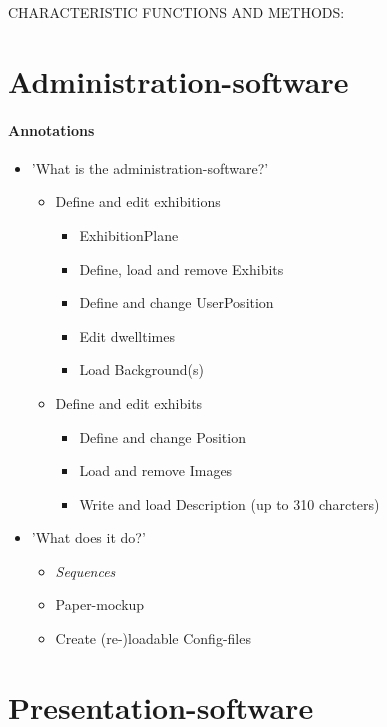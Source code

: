 CHARACTERISTIC FUNCTIONS AND METHODS: 


\section{Administration-software}
\label{implementation_administration}

\paragraph{Annotations}

\begin{itemize}
	\item 'What is the administration-software?'
	\begin{itemize}
		\item Define and edit exhibitions
		\begin{itemize}
			\item ExhibitionPlane
			\item Define, load and remove Exhibits
			\item Define and change UserPosition
			\item Edit dwelltimes
			\item Load Background(s)
		\end{itemize}
		\item Define and edit exhibits
		\begin{itemize}
			\item Define and change Position
			\item Load and remove Images
			\item Write and load Description (up to 310 charcters)
		\end{itemize}
	\end{itemize}
	\item 'What does it do?'
	\begin{itemize}
		\item \textit{Sequences}
		\item Paper-mockup
		\item Create (re-)loadable Config-files
	\end{itemize}
\end{itemize}



\section{Presentation-software}
\label{implementation_presentation}


